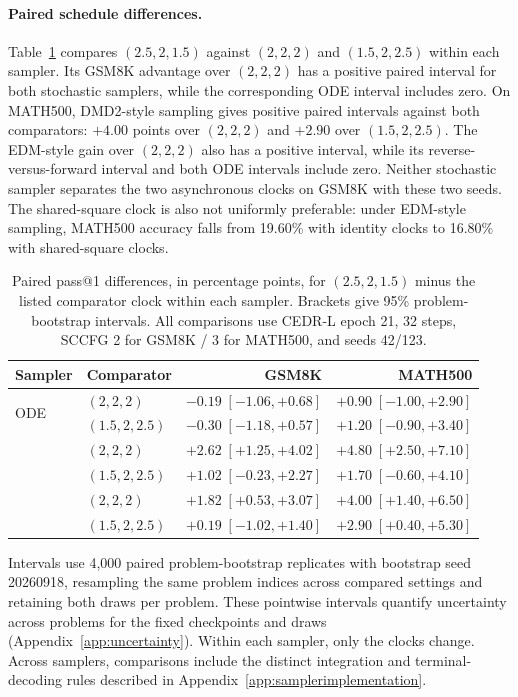 \documentclass[11pt,letterpaper]{article}
\begin{document}
\paragraph{Paired schedule differences.}
Table~\ref{tab:clockpaireddifferences} compares $(2.5,2,1.5)$ against $(2,2,2)$ and $(1.5,2,2.5)$ within each sampler. Its GSM8K advantage over $(2,2,2)$ has a positive paired interval for both stochastic samplers, while the corresponding ODE interval includes zero. On MATH500, DMD2-style sampling gives positive paired intervals against both comparators: $+4.00$ points over $(2,2,2)$ and $+2.90$ over $(1.5,2,2.5)$. The EDM-style gain over $(2,2,2)$ also has a positive interval, while its reverse-versus-forward interval and both ODE intervals include zero. Neither stochastic sampler separates the two asynchronous clocks on GSM8K with these two seeds. The shared-square clock is also not uniformly preferable: under EDM-style sampling, MATH500 accuracy falls from 19.60\% with identity clocks to 16.80\% with shared-square clocks.

\begin{table}[htbp]
\centering\small
\setlength{\tabcolsep}{5pt}
\caption{Paired pass@1 differences, in percentage points, for $(2.5,2,1.5)$ minus the listed comparator clock within each sampler. Brackets give 95\% problem-bootstrap intervals. All comparisons use CEDR-L epoch 21, 32 steps, SCCFG 2 for GSM8K / 3 for MATH500, and seeds 42/123.}
\label{tab:clockpaireddifferences}
\begin{tabular}{@{}llrr@{}}
\toprule
Sampler & Comparator & GSM8K & MATH500 \\
\midrule
\multirow{2}{*}{ODE} & $(2,2,2)$ & $-0.19\;[-1.06,+0.68]$ & $+0.90\;[-1.00,+2.90]$ \\
 & $(1.5,2,2.5)$ & $-0.30\;[-1.18,+0.57]$ & $+1.20\;[-0.90,+3.40]$ \\
\addlinespace[3pt]
\multirow{2}{*}{Stochastic (EDM)} & $(2,2,2)$ & $+2.62\;[+1.25,+4.02]$ & $+4.80\;[+2.50,+7.10]$ \\
 & $(1.5,2,2.5)$ & $+1.02\;[-0.23,+2.27]$ & $+1.70\;[-0.60,+4.10]$ \\
\addlinespace[3pt]
\multirow{2}{*}{Stochastic (DMD2)} & $(2,2,2)$ & $+1.82\;[+0.53,+3.07]$ & $+4.00\;[+1.40,+6.50]$ \\
 & $(1.5,2,2.5)$ & $+0.19\;[-1.02,+1.40]$ & $+2.90\;[+0.40,+5.30]$ \\
\bottomrule
\end{tabular}
\end{table}

Intervals use 4,000 paired problem-bootstrap replicates with bootstrap seed 20260918, resampling the same problem indices across compared settings and retaining both draws per problem. These pointwise intervals quantify uncertainty across problems for the fixed checkpoints and draws (Appendix~\ref{app:uncertainty}). Within each sampler, only the clocks change. Across samplers, comparisons include the distinct integration and terminal-decoding rules described in Appendix~\ref{app:samplerimplementation}.
\end{document}
